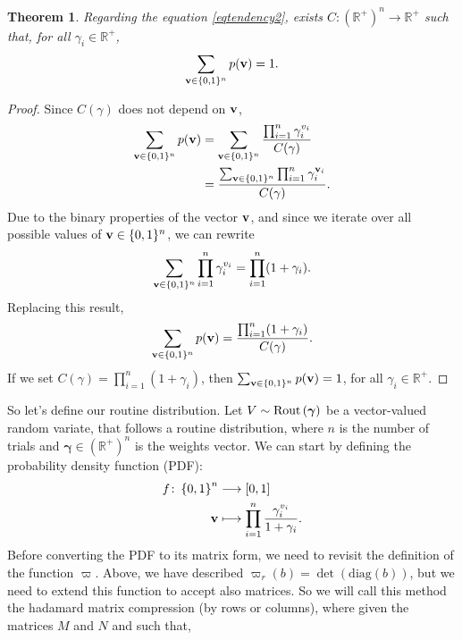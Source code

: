\documentclass{article}
\newtheorem{theorem}{Theorem}
\newcommand{\0}{\mathbbold{0}}
\newcommand{\1}{\mathds{1}}
\newcommand{\2}{\mathbbold{2}}
\newcommand{\diag}[1]{\text{diag}\!\left(#1\right)}
\newcommand{\Rout}[1]{\textup{Rout}\left(#1\right)}
\begin{document}
\begin{theorem}
    Regarding the equation \eqref{eqtendency2}, exists $C\colon \left(\mathbb{R}^+\right)^n \longrightarrow \mathbb{R}^+$ such that, for all $\gamma_i \in \mathbb{R}^+$, $$\sum_{{\bf v} \in \{0,1\}^n}p({\bf v}) = 1.$$
\end{theorem}
\begin{proof}
    Since $C(\gamma)$ does not depend on ${\bf v}$,
    \begin{align*}
        \sum_{{\bf v} \in \{0,1\}^n}p({\bf v}) &= \sum_{{\bf v} \in \{0,1\}^n}\frac{\prod_{i=1}^{n}\gamma_i^{v_i}}{C(\gamma)} \\
        &= \frac{\sum_{{\bf v} \in \{0,1\}^n}\prod_{i=1}^{n}\gamma_i^{{\bf v}_i}}{C(\gamma)}.
    \end{align*}
    Due to the binary properties of the vector ${\bf v}$, and since we iterate over all possible values of ${\bf v} \in \{0,1\}^n$, we can rewrite
    \begin{equation*}
        \sum_{{\bf v} \in \{0,1\}^n}\prod_{i=1}^{n}\gamma_i^{v_i} = \prod_{i=1}^{n}(1+\gamma_i).
    \end{equation*}
    Replacing this result,
    \begin{equation*}
        \sum_{{\bf v} \in \{0,1\}^n}p({\bf v}) = \frac{\prod_{i=1}^{n}(1+\gamma_i)}{C(\gamma)}.
    \end{equation*}
    If we set $C(\gamma) = \prod_{i=1}^{n}(1+\gamma_i)$, then $\sum_{{\bf v} \in \{0,1\}^n}p({\bf v}) = 1$, for all $\gamma_i \in \mathbb{R}^+$.
\end{proof}
So let's define our routine distribution. Let $V \sim \Rout{\boldsymbol \gamma}$ be a vector-valued random variate, that follows a routine distribution, where $n$ is the number of trials and ${\boldsymbol \gamma} \in \left(\mathbb{R}^+\right)^n$ is the weights vector.
We can start by defining the probability density function (PDF):
\begin{align}
    \begin{split}
        f\colon \left\{0,1\right\}^n &\longrightarrow \left[0,1\right] \\
        {\bf v} &\longmapsto \prod_{i=1}^{n}\frac{\gamma_i^{v_i}}{1+\gamma_i}.
    \end{split} \label{pdf2}
\end{align}
Before converting the PDF to its matrix form, we need to revisit the definition of the function $\varpi$. Above, we have described $\varpi_r(b) = \det\!\left(\diag{b}\right)$, but we need to extend this function to accept also matrices. So we will call this method the hadamard matrix compression (by rows or columns), where given the matrices $M$ and $N$ and such that,
\end{document}
